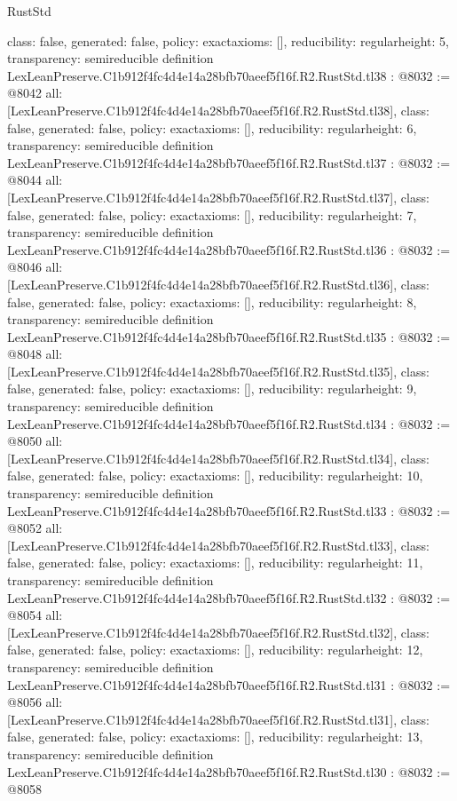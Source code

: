 \begin{lexlean}{RustStd}
\begin{coremodule}
{  class: false,
  generated: false,
  policy: exact{axioms: []},
  reducibility: regular{height: 5},
  transparency: semireducible
}
definition LexLeanPreserve.C1b912f4fc4d4e14a28bfb70aeef5f16f.R2.RustStd.tl38 : @8032 := @8042 {
  all: [LexLeanPreserve.C1b912f4fc4d4e14a28bfb70aeef5f16f.R2.RustStd.tl38],
  class: false,
  generated: false,
  policy: exact{axioms: []},
  reducibility: regular{height: 6},
  transparency: semireducible
}
definition LexLeanPreserve.C1b912f4fc4d4e14a28bfb70aeef5f16f.R2.RustStd.tl37 : @8032 := @8044 {
  all: [LexLeanPreserve.C1b912f4fc4d4e14a28bfb70aeef5f16f.R2.RustStd.tl37],
  class: false,
  generated: false,
  policy: exact{axioms: []},
  reducibility: regular{height: 7},
  transparency: semireducible
}
definition LexLeanPreserve.C1b912f4fc4d4e14a28bfb70aeef5f16f.R2.RustStd.tl36 : @8032 := @8046 {
  all: [LexLeanPreserve.C1b912f4fc4d4e14a28bfb70aeef5f16f.R2.RustStd.tl36],
  class: false,
  generated: false,
  policy: exact{axioms: []},
  reducibility: regular{height: 8},
  transparency: semireducible
}
definition LexLeanPreserve.C1b912f4fc4d4e14a28bfb70aeef5f16f.R2.RustStd.tl35 : @8032 := @8048 {
  all: [LexLeanPreserve.C1b912f4fc4d4e14a28bfb70aeef5f16f.R2.RustStd.tl35],
  class: false,
  generated: false,
  policy: exact{axioms: []},
  reducibility: regular{height: 9},
  transparency: semireducible
}
definition LexLeanPreserve.C1b912f4fc4d4e14a28bfb70aeef5f16f.R2.RustStd.tl34 : @8032 := @8050 {
  all: [LexLeanPreserve.C1b912f4fc4d4e14a28bfb70aeef5f16f.R2.RustStd.tl34],
  class: false,
  generated: false,
  policy: exact{axioms: []},
  reducibility: regular{height: 10},
  transparency: semireducible
}
definition LexLeanPreserve.C1b912f4fc4d4e14a28bfb70aeef5f16f.R2.RustStd.tl33 : @8032 := @8052 {
  all: [LexLeanPreserve.C1b912f4fc4d4e14a28bfb70aeef5f16f.R2.RustStd.tl33],
  class: false,
  generated: false,
  policy: exact{axioms: []},
  reducibility: regular{height: 11},
  transparency: semireducible
}
definition LexLeanPreserve.C1b912f4fc4d4e14a28bfb70aeef5f16f.R2.RustStd.tl32 : @8032 := @8054 {
  all: [LexLeanPreserve.C1b912f4fc4d4e14a28bfb70aeef5f16f.R2.RustStd.tl32],
  class: false,
  generated: false,
  policy: exact{axioms: []},
  reducibility: regular{height: 12},
  transparency: semireducible
}
definition LexLeanPreserve.C1b912f4fc4d4e14a28bfb70aeef5f16f.R2.RustStd.tl31 : @8032 := @8056 {
  all: [LexLeanPreserve.C1b912f4fc4d4e14a28bfb70aeef5f16f.R2.RustStd.tl31],
  class: false,
  generated: false,
  policy: exact{axioms: []},
  reducibility: regular{height: 13},
  transparency: semireducible
}
definition LexLeanPreserve.C1b912f4fc4d4e14a28bfb70aeef5f16f.R2.RustStd.tl30 : @8032 := @8058 {
}
\end{coremodule}
\end{lexlean}
